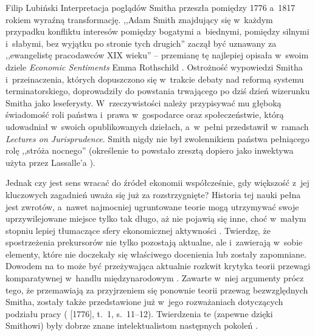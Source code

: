 \begin{artplenv}{Filip Lubiński}
Interpretacja poglądów Smitha przeszła pomiędzy 1776 a~1817 rokiem wyraźną transformację. ,,Adam Smith znajdujący
się w~każdym przypadku konfliktu interesów pomiędzy bogatymi a~biednymi, pomiędzy silnymi i~słabymi, bez wyjątku po
stronie tych drugich''
\parencite[s.~223]{menger_kleinere_1935}
zaczął być uznawany za ,,ewangelistę pracodawców
XIX wieku'' -- przemianę tę najlepiej opisała w~swoim dziele \textit{Economic Sentiments} Emma Rothschild
\parencite*[s.~113]{rothschild_economic_2002}.
Ostrożność wypowiedzi Smitha i~przeinaczenia, których dopuszczono
się w~trakcie debaty nad reformą systemu terminatorskiego, doprowadziły do powstania trwającego po dziś dzień wizerunku
Smitha jako leseferysty. W~rzeczywistości należy przypisywać mu głęboką świadomość roli państwa i~prawa w~gospodarce
oraz społeczeństwie, którą udowadniał w~swoich opublikowanych dziełach, a~w~pełni przedstawił w~ramach \textit{Lectures
on Jurisprudence}. Smith nigdy nie był zwolennikiem państwa pełniącego rolę ,,stróża nocnego'' (określenie to powstało
zresztą dopiero jako inwektywa użyta przez Lassalle'a
\parencite[s.~87]{sawer_ethical_2003}).

Jednak czy jest sens wracać do źródeł ekonomii współcześnie, gdy większość z~jej kluczowych zagadnień uważa się już
za rozstrzygnięte? Historia tej nauki pełna jest zwrotów, a~nawet najmocniej ugruntowane teorie mogą utrzymywać swoje
uprzywilejowane miejsce tylko tak długo, aż nie pojawią się inne, choć w~małym stopniu lepiej tłumaczące sfery
ekonomicznej aktywności
\parencite[s.~33]{blaug_teoria_1994}.
Twierdzę, że spostrzeżenia prekursorów nie tylko
pozostają aktualne, ale i~zawierają w~sobie elementy, które nie doczekały się właściwego docenienia lub zostały
zapomniane. Dowodem na to może być przeżywająca aktualnie rozkwit krytyka teorii przewagi komparatywnej w~handlu
międzynarodowym
\parencite{reinert_how_2008}.
Zawarte w~niej argumenty prócz tego, że przemawiają za
przyjrzeniem się ponownie teorii przewag bezwzględnych Smitha, zostały także przedstawione już w~jego rozważaniach
dotyczących podziału pracy
(\cite{smith_badania_2007} [1776], t.~1, s.~11--12).
Twierdzenia te (zapewne
dzięki Smithowi) były dobrze znane intelektualistom następnych pokoleń
\parencite[s.~343]{tolstoj_anna_1986}.


\end{artplenv}
